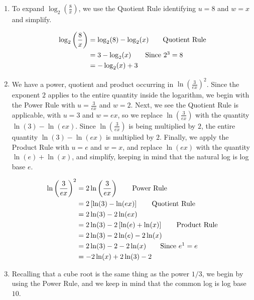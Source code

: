 {
\begin{enumerate}


\item  To expand $\log_{2}\left(\frac{8}{x}\right)$, we use the Quotient Rule identifying $u = 8$ and $w=x$ and simplify.

\begin{align*}
\log_{2}\left(\dfrac{8}{x}\right) & =   \log_{2}(8) - \log_{2}(x) \tag*{Quotient Rule} \\
& =   3 - \log_{2}(x)  \tag*{Since $2^{3} = 8$} \\
& =  - \log_{2}(x) + 3  \\
\end{align*}


\item  We have a power, quotient and product occurring in $\ln \left(\frac{3}{ex}\right)^2$.  Since the exponent $2$ applies to the entire quantity inside the logarithm, we begin with the Power Rule with $u=\frac{3}{ex}$ and $w = 2$.  Next, we see the Quotient Rule is applicable, with $u=3$ and $w=ex$, so we replace $\ln\left(\frac{3}{ex}\right)$  with the quantity $\ln(3) - \ln(ex)$. Since $\ln \left(\frac{3}{ex}\right)$ is being multiplied by $2$, the entire quantity $\ln(3) - \ln(ex)$ is multiplied by $2$.  Finally, we apply the Product Rule with $u=e$ and $w=x$, and replace $\ln(ex)$ with the quantity $\ln(e) + \ln(x)$, and simplify, keeping in mind that the natural log is log base $e$.

\begin{align*}
\ln \left(\dfrac{3}{ex}\right)^2 & =  2 \ln \left(\dfrac{3}{ex}\right)  \tag*{Power Rule} \\
      & =  2 \left[ \ln(3) - \ln(ex) \right]  \tag*{Quotient Rule} \\
      & =  2 \ln(3) - 2\ln(ex)  \\
      & =  2 \ln(3) - 2\left[\ln(e) + \ln(x)\right]  \tag*{Product Rule} \\
      & =  2 \ln(3) - 2\ln(e) - 2 \ln(x)  \\
      & =  2\ln(3) - 2 - 2 \ln(x)  \tag*{Since $e^{1} = e$} \\
      & =  - 2 \ln(x) + 2\ln(3) - 2  \\
\end{align*}
                        

\item Recalling that a cube root is the same thing as the power $1/3$, we begin by using the Power Rule, and we keep in mind that the common log is log base $10$. 


\end{enumerate}}
